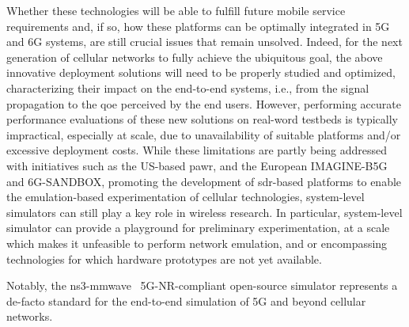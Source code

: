 Whether these technologies will be able to fulfill future mobile service requirements and, if so, how these platforms can be optimally integrated in 5G and 6G systems, are still crucial issues that remain unsolved. 
Indeed, for the next generation of cellular networks to fully achieve the ubiquitous goal, the above innovative deployment solutions will need to be properly studied and optimized, characterizing their impact on the end-to-end systems, i.e., from the signal propagation to the \gls{qoe} perceived by the end users.
However, performing accurate performance evaluations of these new solutions on real-word testbeds is typically impractical, especially at scale, due to unavailability of suitable platforms and/or excessive deployment costs.
While these limitations are partly being addressed with initiatives such as the US-based \gls{pawr}, and the European IMAGINE-B5G and 6G-SANDBOX, promoting the development of \gls{sdr}-based platforms to enable the emulation-based experimentation of cellular technologies, system-level simulators can still play a key role in wireless research.
In particular, system-level simulator can provide a playground for preliminary experimentation, at a scale which makes it unfeasible to perform network emulation, and or encompassing technologies for which hardware prototypes are not yet available. 

Notably, the ns3-mmwave~\cite{mezzavilla2018end} 5G-NR-compliant open-source simulator represents a de-facto standard for the end-to-end simulation of 5G and beyond cellular networks.


